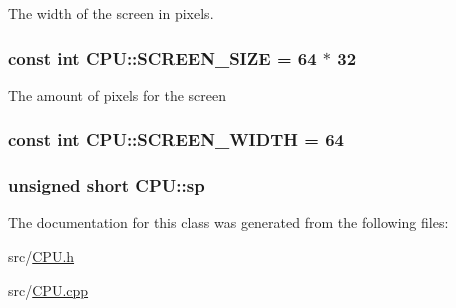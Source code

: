 The width of the screen in pixels. \hypertarget{classCPU_a06c3d3ec8c47f48c437256e8910840a1}{
\subsubsection[{S\-C\-R\-E\-E\-N\-\_\-\-S\-I\-Z\-E}]{\setlength{\rightskip}{0pt plus 5cm}const int C\-P\-U\-::\-S\-C\-R\-E\-E\-N\-\_\-\-S\-I\-Z\-E = 64 $\ast$ 32\hspace{0.3cm}{\ttfamily [static]}}}\label{classCPU_a06c3d3ec8c47f48c437256e8910840a1}
The amount of pixels for the screen \hypertarget{classCPU_a8feada83f7887e1a418c4dd308fbd4a9}{
\subsubsection[{S\-C\-R\-E\-E\-N\-\_\-\-W\-I\-D\-T\-H}]{\setlength{\rightskip}{0pt plus 5cm}const int C\-P\-U\-::\-S\-C\-R\-E\-E\-N\-\_\-\-W\-I\-D\-T\-H = 64\hspace{0.3cm}{\ttfamily [static]}}}\label{classCPU_a8feada83f7887e1a418c4dd308fbd4a9}
\hypertarget{classCPU_a4d0854788d689d0f4ee604f3001b1732}{
\subsubsection[{sp}]{\setlength{\rightskip}{0pt plus 5cm}unsigned short C\-P\-U\-::sp\hspace{0.3cm}{\ttfamily [private]}}}\label{classCPU_a4d0854788d689d0f4ee604f3001b1732}


The documentation for this class was generated from the following files\-:\begin{DoxyCompactItemize}
\item 
src/\hyperlink{CPU_8h}{C\-P\-U.\-h}\item 
src/\hyperlink{CPU_8cpp}{C\-P\-U.\-cpp}\end{DoxyCompactItemize}
